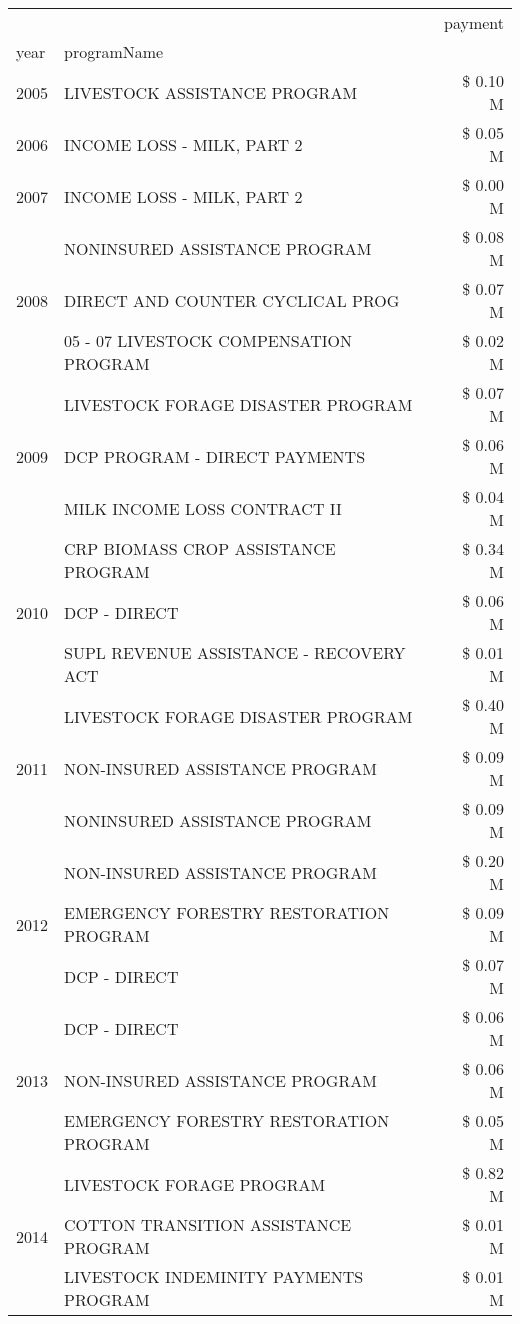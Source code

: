 \begin{tabular}{llr}
\toprule
 &  & payment \\
year & programName &  \\
\midrule
2005 & LIVESTOCK ASSISTANCE PROGRAM & \$ 0.10 M \\
\cline{1-3}
2006 & INCOME LOSS - MILK, PART 2 & \$ 0.05 M \\
\cline{1-3}
2007 & INCOME LOSS - MILK, PART 2 & \$ 0.00 M \\
\cline{1-3}
\multirow[t]{3}{*}{2008} & NONINSURED ASSISTANCE PROGRAM & \$ 0.08 M \\
 & DIRECT AND COUNTER CYCLICAL PROG & \$ 0.07 M \\
 & 05 - 07 LIVESTOCK COMPENSATION PROGRAM & \$ 0.02 M \\
\cline{1-3}
\multirow[t]{3}{*}{2009} & LIVESTOCK FORAGE DISASTER  PROGRAM & \$ 0.07 M \\
 & DCP PROGRAM - DIRECT PAYMENTS & \$ 0.06 M \\
 & MILK INCOME LOSS CONTRACT II & \$ 0.04 M \\
\cline{1-3}
\multirow[t]{3}{*}{2010} & CRP BIOMASS CROP ASSISTANCE PROGRAM & \$ 0.34 M \\
 & DCP - DIRECT & \$ 0.06 M \\
 & SUPL REVENUE ASSISTANCE - RECOVERY ACT & \$ 0.01 M \\
\cline{1-3}
\multirow[t]{3}{*}{2011} & LIVESTOCK FORAGE DISASTER PROGRAM & \$ 0.40 M \\
 & NON-INSURED ASSISTANCE PROGRAM & \$ 0.09 M \\
 & NONINSURED ASSISTANCE PROGRAM & \$ 0.09 M \\
\cline{1-3}
\multirow[t]{3}{*}{2012} & NON-INSURED ASSISTANCE PROGRAM & \$ 0.20 M \\
 & EMERGENCY FORESTRY RESTORATION PROGRAM & \$ 0.09 M \\
 & DCP - DIRECT & \$ 0.07 M \\
\cline{1-3}
\multirow[t]{3}{*}{2013} & DCP - DIRECT & \$ 0.06 M \\
 & NON-INSURED ASSISTANCE PROGRAM & \$ 0.06 M \\
 & EMERGENCY FORESTRY RESTORATION PROGRAM & \$ 0.05 M \\
\cline{1-3}
\multirow[t]{3}{*}{2014} & LIVESTOCK FORAGE PROGRAM & \$ 0.82 M \\
 & COTTON TRANSITION ASSISTANCE PROGRAM & \$ 0.01 M \\
 & LIVESTOCK INDEMINITY PAYMENTS PROGRAM & \$ 0.01 M \\

\end{tabular}
